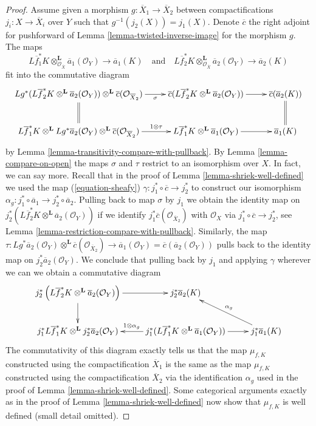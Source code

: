 \documentclass[10pt,a4paper]{amsart}
\theoremstyle{plain}
\theoremstyle{definition}
\theoremstyle{remark}
\numberwithin{equation}{subsection}
\begin{document}
\begin{proof}
\medskip\noindent
Assume given a morphism $g : \overline{X}_1 \to \overline{X}_2$
between compactifications $j_i : X \to \overline{X}_i$ over $Y$
such that $g^{-1}(j_2(X)) = j_1(X)$. Denote $\overline{c}$ the
right adjoint for pushforward of Lemma \ref{lemma-twisted-inverse-image}
for the morphism $g$. The maps
$$
L\overline{f}_1^*K \otimes_{\mathcal{O}_{\overline{X}}}^\mathbf{L}
\overline{a}_1(\mathcal{O}_Y)
\longrightarrow
\overline{a}_1(K)
\quad\text{and}\quad
L\overline{f}_2^*K \otimes_{\mathcal{O}_{\overline{X}}}^\mathbf{L}
\overline{a}_2(\mathcal{O}_Y)
\longrightarrow
\overline{a}_2(K)
$$
fit into the commutative diagram
$$
\xymatrix{
Lg^*(L\overline{f}_2^*K \otimes^\mathbf{L}
\overline{a}_2(\mathcal{O}_Y))
\otimes^\mathbf{L} \overline{c}(\mathcal{O}_{\overline{X}_2})
\ar@{=}[d] \ar[r]_-\sigma &
\overline{c}(L\overline{f}_2^*K \otimes^\mathbf{L}
\overline{a}_2(\mathcal{O}_Y)) \ar[r] &
\overline{c}(\overline{a}_2(K)) \ar@{=}[d] \\
L\overline{f}_1^*K \otimes^\mathbf{L} Lg^*\overline{a}_2(\mathcal{O}_Y)
\otimes^\mathbf{L} \overline{c}(\mathcal{O}_{\overline{X}_2})
\ar[r]^-{1 \otimes \tau} &
L\overline{f}_1^*K \otimes^\mathbf{L} \overline{a}_1(\mathcal{O}_Y) \ar[r] &
\overline{a}_1(K)
}
$$
by Lemma \ref{lemma-transitivity-compare-with-pullback}. By
Lemma \ref{lemma-compare-on-open} the maps $\sigma$ and $\tau$
restrict to an isomorphism over $X$. In fact, we can say more.
Recall that in the proof of Lemma \ref{lemma-shriek-well-defined} we used
the map (\ref{equation-sheafy}) $\gamma : j_1^* \circ \overline{c} \to j_2^*$
to construct our isomorphism
$\alpha_g : j_1^* \circ \overline{a}_1 \to j_2^* \circ \overline{a}_2$.
Pulling back to map $\sigma$ by $j_1$ we obtain the identity
map on $j_2^*\left(L\overline{f}_2^*K \otimes^\mathbf{L}
\overline{a}_2(\mathcal{O}_Y)\right)$ if we identify
$j_1^*\overline{c}(\mathcal{O}_{\overline{X}_2})$
with $\mathcal{O}_X$ via $j_1^* \circ \overline{c} \to j_2^*$, see
Lemma \ref{lemma-restriction-compare-with-pullback}.
Similarly, the map $\tau : Lg^*\overline{a}_2(\mathcal{O}_Y)
\otimes^\mathbf{L} \overline{c}(\mathcal{O}_{\overline{X}_2}) \to
\overline{a}_1(\mathcal{O}_Y) = \overline{c}(\overline{a}_2(\mathcal{O}_Y))$
pulls back to the identity map on $j_2^*\overline{a}_2(\mathcal{O}_Y)$.
We conclude that pulling back by $j_1$ and applying $\gamma$ wherever
we can we obtain a commutative diagram
$$
\xymatrix{
j_2^*\left(L\overline{f}_2^*K \otimes^\mathbf{L}
\overline{a}_2(\mathcal{O}_Y)\right) \ar[r] \ar[d] &
j_2^*\overline{a}_2(K) \\
j_1^*L\overline{f}_1^*K \otimes^\mathbf{L} j_2^*\overline{a}_2(\mathcal{O}_Y) &
j_1^*(L\overline{f}_1^*K \otimes^\mathbf{L} \overline{a}_1(\mathcal{O}_Y))
\ar[r] \ar[l]_{1 \otimes \alpha_g} &
j_1^* \overline{a}_1(K) \ar[lu]_{\alpha_g}
}
$$
The commutativity of this diagram exactly tells us that the map
$\mu_{f, K}$ constructed using the compactification $\overline{X}_1$
is the same as the map $\mu_{f, K}$ constructed using the compactification
$\overline{X}_2$ via the identification $\alpha_g$ used in the proof
of Lemma \ref{lemma-shriek-well-defined}. Some categorical arguments
exactly as in the proof of  Lemma \ref{lemma-shriek-well-defined}
now show that $\mu_{f, K}$ is well defined (small detail omitted).


\end{proof}
\end{document}
